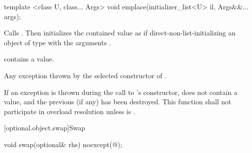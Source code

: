 %
\begin{itemdecl}
template <class U, class... Args> void emplace(initializer_list<U> il, Args&&... args);
\end{itemdecl}

\begin{itemdescr}
\pnum
\effects
Calls . Then initializes the contained value as if direct-non-list-initializing an object of type  with the arguments .

\pnum
\postcondition
{} contains a value.

\pnum
\throws
Any exception thrown by the selected constructor of .

\pnum
\remarks
If an exception is thrown during the call to 's constructor,  does not contain a value, and the previous  (if any) has been destroyed.
This function shall not participate in overload resolution unless  is .
\end{itemdescr}

[optional.object.swap]{Swap}

%
\begin{itemdecl}
void swap(optional& rhs) noexcept(@\seebelow@);
\end{itemdecl}

